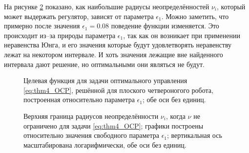 На рисунке \ref{fig:mult_soft_nu} показано, как наибольшие радиусы неопределённостей $\nu_i$, который может выдержать регулятор, зависят от параметра $\epsilon_1$. Можно заметить, что примерно после значения $\epsilon_1 = 0.08$ поведение функции изменяется. Это происходит из--за природы параметра $\epsilon_1$, так как он возникает при применении неравенства Юнга, и его значения которые будут удовлетворять неравенству лежат на некотором интервале. И хоть значения лежащие вне найденного интервала дают решение, но оптимальными они являться не будут. 

\begin{figure}[ht]
	\caption{Целевая функция для задачи оптимального управления \eqref{eq:thm4_OCP}, решённой для плоского четвероногого робота, построенная относительно параметра $\epsilon_1$; обе оси без единиц.} \label{fig:mult_soft_lin_cost}
\end{figure} 

\begin{figure}[ht]
	\caption{Верхняя граница радиусов неопределённости $\nu_i$, когда $\nu$ не ограничено для задачи \eqref{eq:thm4_OCP}; графики построены относительно значения свободного параметра $\epsilon_1$; вертикальная ось масштабирована логарифмически, обе оси без единиц.}\label{fig:mult_soft_nu}
\end{figure} 

